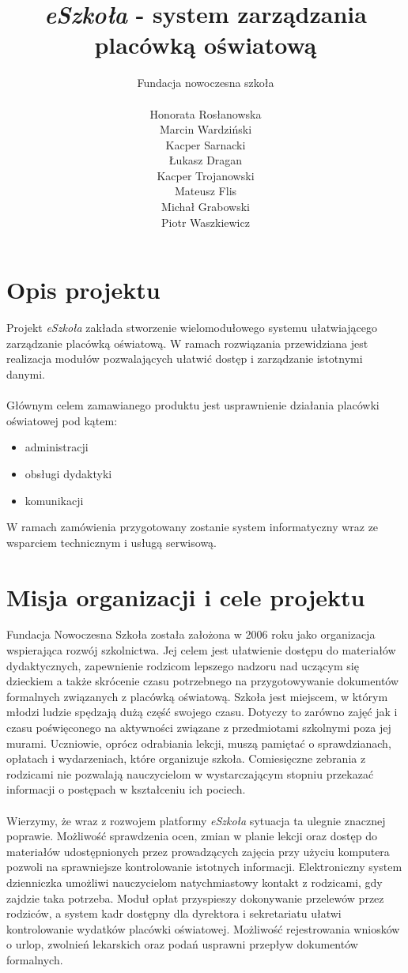 \documentclass{article}
\author{Fundacja nowoczesna szkoła\\\\
Honorata Rosłanowska \\
Marcin Wardziński\\
Kacper Sarnacki \\
Łukasz Dragan \\
Kacper Trojanowski \\
Mateusz Flis \\
Michał Grabowski \\
Piotr Waszkiewicz}
\title{\textit{eSzkoła} - system zarządzania placówką oświatową}
\begin{document}
\maketitle
\newpage
\tableofcontents
\newpage

\section{Opis projektu}
Projekt \textit{eSzkoła} zakłada stworzenie wielomodułowego systemu ułatwiającego zarządzanie placówką oświatową. W ramach rozwiązania przewidziana jest realizacja modułów pozwalających ułatwić dostęp i zarządzanie istotnymi danymi. \\ \\
Głównym celem zamawianego produktu jest usprawnienie działania placówki oświatowej pod kątem:
\begin{itemize}
    \item administracji
    \item obsługi dydaktyki
    \item komunikacji
\end{itemize}
W ramach zamówienia przygotowany zostanie system informatyczny wraz ze wsparciem technicznym i usługą serwisową.

\section{Misja organizacji i cele projektu}
Fundacja Nowoczesna Szkoła została założona w 2006 roku jako organizacja wspierająca rozwój szkolnictwa. Jej celem jest ułatwienie dostępu do materiałów dydaktycznych, zapewnienie rodzicom lepszego nadzoru nad uczącym się dzieckiem a także skrócenie czasu potrzebnego na przygotowywanie dokumentów formalnych związanych z placówką oświatową. Szkoła jest miejscem, w którym młodzi ludzie spędzają dużą część swojego czasu. Dotyczy to zarówno zajęć jak i czasu poświęconego na aktywności związane z przedmiotami szkolnymi poza jej murami. Uczniowie, oprócz odrabiania lekcji, muszą pamiętać o sprawdzianach, opłatach i wydarzeniach, które organizuje szkoła. Comiesięczne zebrania z rodzicami nie pozwalają nauczycielom w wystarczającym stopniu przekazać informacji o postępach w kształceniu ich pociech. \\ \\
Wierzymy, że wraz z rozwojem platformy \textit{eSzkoła} sytuacja ta ulegnie znacznej poprawie. Możliwość sprawdzenia ocen, zmian w planie lekcji oraz dostęp do materiałów udostępnionych przez prowadzących zajęcia przy użyciu komputera pozwoli na sprawniejsze kontrolowanie istotnych informacji. Elektroniczny system dzienniczka umożliwi nauczycielom natychmiastowy kontakt z rodzicami, gdy zajdzie taka potrzeba. Moduł opłat przyspieszy dokonywanie przelewów przez rodziców, a system kadr dostępny dla dyrektora i sekretariatu ułatwi kontrolowanie wydatków placówki oświatowej. Możliwość rejestrowania wniosków o urlop, zwolnień lekarskich oraz podań usprawni przepływ dokumentów formalnych.
\end{document}
